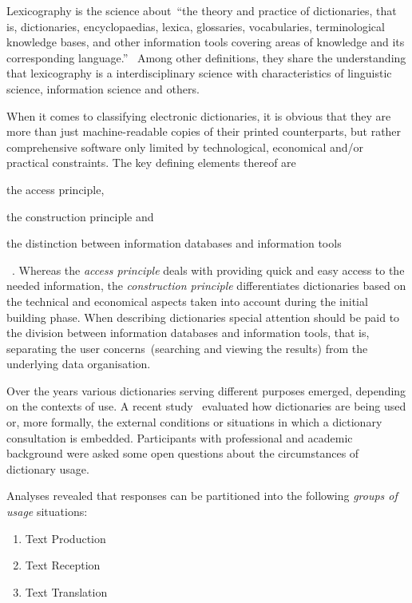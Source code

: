 \documentclass[draft,final]{vutinfth} %
\begin{document}
Lexicography is the science about~\enquote{the theory and practice of dictionaries, that is, dictionaries, encyclopaedias, lexica, glossaries, vocabularies, terminological knowledge bases, and other information tools covering areas of knowledge and its corresponding language.}~\cite{fuertes2017}
Among other definitions, they share the understanding that lexicography is a interdisciplinary science with characteristics of linguistic science, information science and others. 

When it comes to classifying electronic dictionaries, it is obvious that they are more than just machine-readable copies of their printed counterparts, but rather comprehensive software only limited by technological, economical and/or practical constraints. The key defining elements thereof are 
\begin{inparaenum}[i)]
		\item the access principle,
		\item the construction principle and
		\item the distinction between information databases and information tools
\end{inparaenum}~\cite{fuertes2011}.
Whereas the \textit{access principle} deals with providing quick and easy access to the needed information, the \textit{construction principle} differentiates dictionaries based on the technical and economical aspects taken into account during the initial building phase. When describing dictionaries special attention should be paid to the division between information databases and information tools, that is, separating the user concerns~(searching and viewing the results) from the underlying data organisation. 

Over the years various dictionaries serving different purposes emerged, depending on the contexts of use. A recent study~\cite{mueller_spitzer2013} evaluated how dictionaries are being used or, more formally, the external conditions or situations in which a dictionary consultation is embedded.  
Participants with professional and academic background were asked some open questions about the circumstances of dictionary usage. 

Analyses revealed that responses can be partitioned into the following \textit{groups of usage} situations: 
\begin{enumerate}
	\item Text Production
	\item Text Reception
	\item Text Translation
\end{enumerate}
\end{document}
